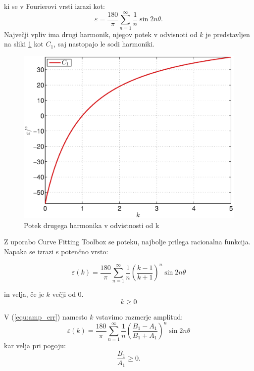 \documentclass[a4paper]{article}
\begin{document}
ki se v Fourierovi vrsti izrazi kot:
\begin{equation}
\label{equ:lim_amp_vrsta}
\varepsilon = \frac{180}{\pi}\sum_{n=1}^{\infty}\frac{1}{n} \sin 2 n \theta.
\end{equation}
Največji vpliv ima drugi harmonik, njegov potek v odvisnoti od $k$ je predstavljen na sliki \ref{fig:amp} kot $C_1$, saj nastopajo le sodi harmoniki.
\begin{figure}[!htb]
	\begin{center}
		\includegraphics[width=\linewidth]{./Slike/amp.eps}
		\caption{Potek drugega harmonika v odvistnosti od k} \label{fig:amp}
	\end{center}
\end{figure}

Z uporabo Curve Fitting Toolbox se poteku, najbolje prilega  racionalna funkcija. Napaka se izrazi s potenčno vrsto:

\begin{equation}
\label{equ:amp_err}
\varepsilon(k) =\frac{180}{\pi}\sum_{n=1}^{\infty}\frac{1}{n}(\frac{k-1}{k+1})^n \sin 2 n \theta
\end{equation}

in velja, če je $k$ večji od 0.$$k \geq 0$$

V (\ref{equ:amp_err}) namesto $k$ vstavimo razmerje amplitud:
\begin{equation}
\label{equ:amp_err2}
\varepsilon(k) =\frac{180}{\pi}\sum_{n=1}^{\infty}\frac{1}{n}(\frac{B_1-A_1}{B_1+A_1})^n \sin 2 n \theta
\end{equation}
kar velja pri pogoju: $$\frac{B_1}{A_1} \geq 0.$$
\end{document}
